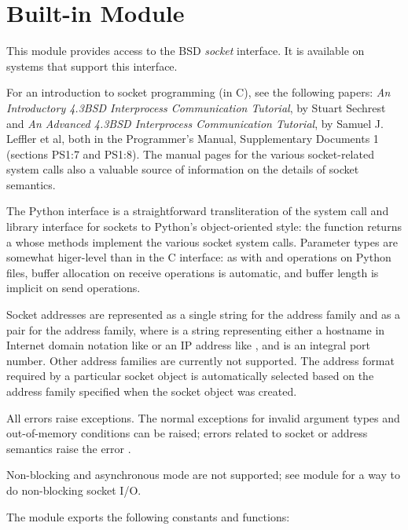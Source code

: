\section{Built-in Module }

This module provides access to the BSD {\em socket} interface.
It is available on \UNIX{} systems that support this interface.

For an introduction to socket programming (in C), see the following
papers: \emph{An Introductory 4.3BSD Interprocess Communication
Tutorial}, by Stuart Sechrest and \emph{An Advanced 4.3BSD Interprocess
Communication Tutorial}, by Samuel J.  Leffler et al, both in the
\UNIX{} Programmer's Manual, Supplementary Documents 1 (sections PS1:7
and PS1:8).  The \UNIX{} manual pages for the various socket-related
system calls also a valuable source of information on the details of
socket semantics.

The Python interface is a straightforward transliteration of the
\UNIX{} system call and library interface for sockets to Python's
object-oriented style: the  function returns a
 whose methods implement the various socket system
calls.  Parameter types are somewhat higer-level than in the C
interface: as with  and  operations on Python
files, buffer allocation on receive operations is automatic, and
buffer length is implicit on send operations.

Socket addresses are represented as a single string for the
 address family and as a pair
 for the  address family,
where  is a string representing
either a hostname in Internet domain notation like
 or an IP address like ,
and  is an integral port number.  Other address families are
currently not supported.  The address format required by a particular
socket object is automatically selected based on the address family
specified when the socket object was created.

All errors raise exceptions.  The normal exceptions for invalid
argument types and out-of-memory conditions can be raised; errors
related to socket or address semantics raise the error .

Non-blocking and asynchronous mode are not supported; see module
 for a way to do non-blocking socket I/O.

The module  exports the following constants and functions:

